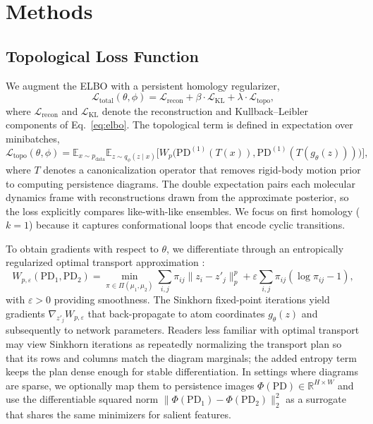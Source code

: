 \documentclass[11pt]{article}
\begin{document}
\section{Methods}
\subsection{Topological Loss Function}
We augment the ELBO with a persistent homology regularizer,
\begin{equation}
    \mathcal{L}_{\text{total}}(\theta, \phi) = \mathcal{L}_{\text{recon}} + \beta \cdot \mathcal{L}_{\text{KL}} + \lambda \cdot \mathcal{L}_{\text{topo}},
    \label{eq:total_loss}
\end{equation}
where $\mathcal{L}_{\text{recon}}$ and $\mathcal{L}_{\text{KL}}$ denote the reconstruction and Kullback--Leibler components of Eq.~\eqref{eq:elbo}. The topological term is defined in expectation over minibatches,
\begin{equation}
    \mathcal{L}_{\text{topo}}(\theta, \phi) = \mathbb{E}_{x \sim p_{\text{data}}} \mathbb{E}_{z \sim q_\phi(z \mid x)} \big[ W_p\big( \mathrm{PD}^{(1)}(T(x)), \mathrm{PD}^{(1)}(T(g_\theta(z))) \big) \big],
    \label{eq:topo-loss}
\end{equation}
where $T$ denotes a canonicalization operator that removes rigid-body motion prior to computing persistence diagrams. The double expectation pairs each molecular dynamics frame with reconstructions drawn from the approximate posterior, so the loss explicitly compares like-with-like ensembles. We focus on first homology ($k=1$) because it captures conformational loops that encode cyclic transitions.

To obtain gradients with respect to $\theta$, we differentiate through an entropically regularized optimal transport approximation \cite{cuturi2013sinkhorn}:
\begin{equation}
    W_{p, \varepsilon}(\mathrm{PD}_1, \mathrm{PD}_2) = \min_{\pi \in \Pi(\mu_1, \mu_2)} \sum_{i,j} \pi_{ij} \| z_i - z'_j \|_p^p + \varepsilon \sum_{i,j} \pi_{ij} (\log \pi_{ij} - 1),
    \label{eq:entropic-wasserstein}
\end{equation}
with $\varepsilon > 0$ providing smoothness. The Sinkhorn fixed-point iterations yield gradients $\nabla_{z'_j} W_{p, \varepsilon}$ that back-propagate to atom coordinates $g_\theta(z)$ and subsequently to network parameters. Readers less familiar with optimal transport may view Sinkhorn iterations as repeatedly normalizing the transport plan so that its rows and columns match the diagram marginals; the added entropy term keeps the plan dense enough for stable differentiation. In settings where diagrams are sparse, we optionally map them to persistence images $\Phi(\mathrm{PD}) \in \mathbb{R}^{H \times W}$ and use the differentiable squared norm $\| \Phi(\mathrm{PD}_1) - \Phi(\mathrm{PD}_2) \|_2^2$ \cite{adams2017persistence} as a surrogate that shares the same minimizers for salient features.
\end{document}
